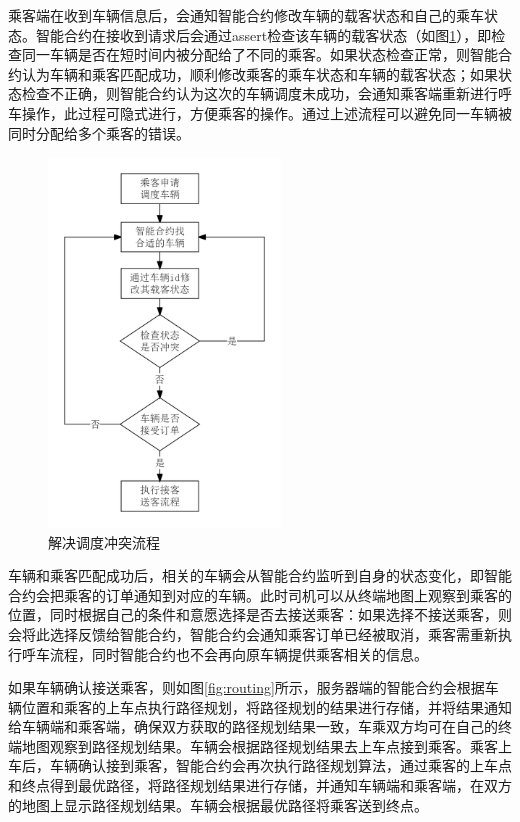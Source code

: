 乘客端在收到车辆信息后，会通知智能合约修改车辆的载客状态和自己的乘车状态。智能合约在接收到请求后会通过assert检查该车辆的载客状态（如图\ref{fig:conflict}），即检查同一车辆是否在短时间内被分配给了不同的乘客。如果状态检查正常，则智能合约认为车辆和乘客匹配成功，顺利修改乘客的乘车状态和车辆的载客状态；如果状态检查不正确，则智能合约认为这次的车辆调度未成功，会通知乘客端重新进行呼车操作，此过程可隐式进行，方便乘客的操作。通过上述流程可以避免同一车辆被同时分配给多个乘客的错误。\par

\begin{figure}
  \centering
  \includegraphics[width=0.55\textwidth]{figures/解决调度冲突}
  \caption{解决调度冲突流程}\label{fig:conflict}
\end{figure}

车辆和乘客匹配成功后，相关的车辆会从智能合约监听到自身的状态变化，即智能合约会把乘客的订单通知到对应的车辆。此时司机可以从终端地图上观察到乘客的位置，同时根据自己的条件和意愿选择是否去接送乘客：如果选择不接送乘客，则会将此选择反馈给智能合约，智能合约会通知乘客订单已经被取消，乘客需重新执行呼车流程，同时智能合约也不会再向原车辆提供乘客相关的信息。\par

如果车辆确认接送乘客，则如图\ref{fig:routing}所示，服务器端的智能合约会根据车辆位置和乘客的上车点执行路径规划，将路径规划的结果进行存储，并将结果通知给车辆端和乘客端，确保双方获取的路径规划结果一致，车乘双方均可在自己的终端地图观察到路径规划结果。车辆会根据路径规划结果去上车点接到乘客。乘客上车后，车辆确认接到乘客，智能合约会再次执行路径规划算法，通过乘客的上车点和终点得到最优路径，将路径规划结果进行存储，并通知车辆端和乘客端，在双方的地图上显示路径规划结果。车辆会根据最优路径将乘客送到终点。\par

